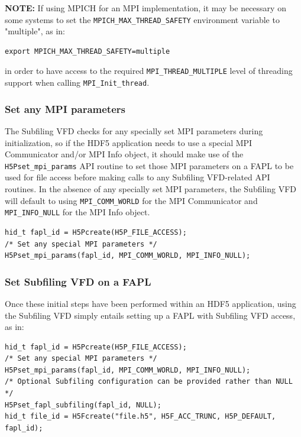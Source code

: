 \documentclass[../main.tex]{subfiles}
\begin{document}
\textbf{NOTE:} If using MPICH for an MPI implementation, it may be necessary on
some systems to set the \texttt{MPICH\_MAX\_THREAD\_SAFETY} environment variable
to "multiple", as in:

\begin{verbatim}
export MPICH_MAX_THREAD_SAFETY=multiple
\end{verbatim}

in order to have access to the required \texttt{MPI\_THREAD\_MULTIPLE} level of
threading support when calling \texttt{MPI\_Init\_thread}.

\subsubsection{Set any MPI parameters}
\label{sec:req2}

The Subfiling VFD checks for any specially set MPI parameters during initialization,
so if the HDF5 application needs to use a special MPI Communicator and/or MPI Info
object, it should make use of the \texttt{H5Pset\_mpi\_params} API routine to set
those MPI parameters on a \Gls{FAPL} to be used for file access before making calls
to any Subfiling VFD-related API routines. In the absence of any specially set MPI
parameters, the Subfiling VFD will default to using \texttt{MPI\_COMM\_WORLD} for the
MPI Communicator and \texttt{MPI\_INFO\_NULL} for the MPI Info object.

\begin{verbatim}
hid_t fapl_id = H5Pcreate(H5P_FILE_ACCESS);
/* Set any special MPI parameters */
H5Pset_mpi_params(fapl_id, MPI_COMM_WORLD, MPI_INFO_NULL);
\end{verbatim}

\subsubsection{Set Subfiling VFD on a FAPL}

Once these initial steps have been performed within an HDF5 application, using
the Subfiling VFD simply entails setting up a \Gls{FAPL} with Subfiling VFD access,
as in:

\begin{verbatim}
hid_t fapl_id = H5Pcreate(H5P_FILE_ACCESS);
/* Set any special MPI parameters */
H5Pset_mpi_params(fapl_id, MPI_COMM_WORLD, MPI_INFO_NULL);
/* Optional Subfiling configuration can be provided rather than NULL */
H5Pset_fapl_subfiling(fapl_id, NULL);
hid_t file_id = H5Fcreate("file.h5", H5F_ACC_TRUNC, H5P_DEFAULT, fapl_id);
\end{verbatim}
\end{document}
